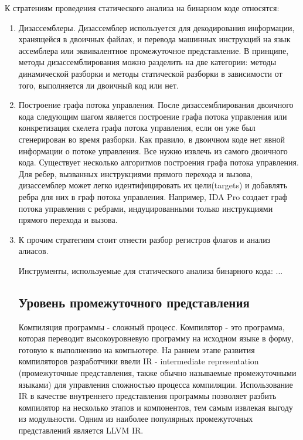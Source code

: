 К стратениям проведения статического анализа на бинарном коде относятся:
\begin{enumerate}
    \item Дизассемблеры. Дизассемблер используется для декодирования информации, хранящейся в двоичных файлах, и перевода 
        машинных инструкций на язык ассемблера или эквивалентное промежуточное представление. В принципе, методы 
        дизассемблирования можно разделить на две категории: методы динамической разборки и методы статической разборки в 
        зависимости от того, выполняется ли двоичный код или нет. 
    \item Построение графа потока управления. После дизассемблирования двоичного кода следующим шагом является построение 
        графа потока управления или конкретизация скелета графа потока управления, если он уже был сгенерирован во время
        разборки. Как правило, в двоичном коде нет явной информации о потоке управления. Все нужно извлечь из самого 
        двоичного кода. Существует несколько алгоритмов построения графа потока управления. Для ребер, вызванных 
        инструкциями прямого перехода и вызова, дизассемблер может легко идентифицировать их цели(targets) и добавлять 
        ребра для них в граф потока управления. Например, IDA Pro\cite{} создает граф потока управления с ребрами, 
        индуцированными только инструкциями прямого перехода и вызова. 
    \item К прочим стратегиям стоит отнести разбор регистров флагов\cite{} и анализ алиасов\cite{}.

Инструменты, используемые для статического анализа бинарного кода: ... 

\subsection{Уровень промежуточного представления}
Компиляция программы - сложный процесс. Компилятор - это программа, которая переводит высокоуровневую программу на исходном языке в форму, готовую к 
выполнению на компьютере. На раннем этапе развития компиляторов разработчики ввели IR - intermediate representation (промежуточные представления, 
также обычно называемые промежуточными языками) для управления сложностью процесса компиляции. Использование IR в качестве внутреннего представления 
программы позволяет разбить компилятор на несколько этапов и компонентов, тем самым извлекая выгоду из модульности. Одним из наиболее популярных 
промежуточных представлений является LLVM IR.


\end{enumerate}
